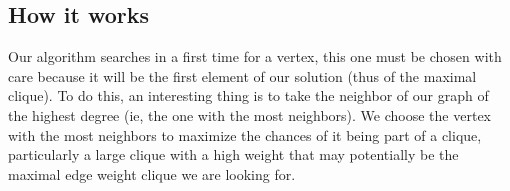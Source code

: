 
\subsection{How it works}

    Our algorithm searches in a first time for a vertex, this one must be chosen with care because it will be the first element of our solution (thus of the maximal clique). To do this, an interesting thing is to take the neighbor of our graph of the highest degree (ie, the one with the most neighbors). We choose the vertex with the most neighbors to maximize the chances of it being part of a clique, particularly a large clique with a high weight that may potentially be the maximal edge weight clique we are looking for. 


